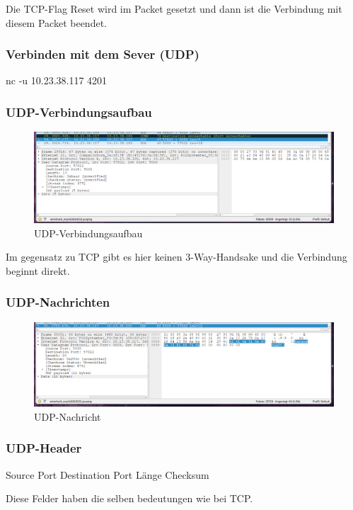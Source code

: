 \documentclass[a4paper]{article}
\begin{document}
Die TCP-Flag Reset wird im Packet gesetzt und dann ist die Verbindung mit diesem Packet beendet.
\subsubsection{Verbinden mit dem Sever (UDP)}
nc -u 10.23.38.117 4201
\subsubsection{UDP-Verbindungsaufbau}
\begin{figure}[h]
	\includegraphics[scale=0.3]{images/udpverbindungsaufbau.png}
	\caption{UDP-Verbindungsaufbau}
\end{figure}

Im gegensatz zu TCP gibt es hier keinen 3-Way-Handsake und die Verbindung beginnt direkt.
\subsubsection{UDP-Nachrichten}
\begin{figure}[h]
	\includegraphics[scale=0.3]{images/udp-nachricht.png}
	\caption{UDP-Nachricht}
\end{figure}
\subsubsection {UDP-Header}
\begin{outline}
	\1 Source Port
	\1 Destination Port
	\1 Länge
	\1 Checksum
\end{outline}
Diese Felder haben die selben bedeutungen wie bei TCP.
\cite{UDP}
\end{document}
